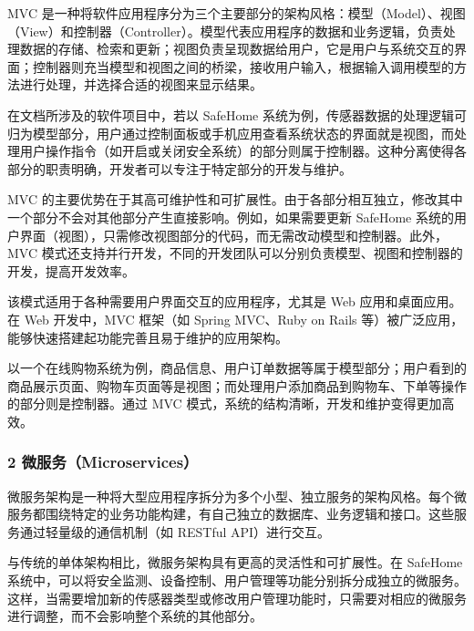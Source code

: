 
MVC 是一种将软件应用程序分为三个主要部分的架构风格：模型（Model）、视图（View）和控制器（Controller）。模型代表应用程序的数据和业务逻辑，负责处理数据的存储、检索和更新；视图负责呈现数据给用户，它是用户与系统交互的界面；控制器则充当模型和视图之间的桥梁，接收用户输入，根据输入调用模型的方法进行处理，并选择合适的视图来显示结果。

在文档所涉及的软件项目中，若以 SafeHome 系统为例，传感器数据的处理逻辑可归为模型部分，用户通过控制面板或手机应用查看系统状态的界面就是视图，而处理用户操作指令（如开启或关闭安全系统）的部分则属于控制器。这种分离使得各部分的职责明确，开发者可以专注于特定部分的开发与维护。


MVC 的主要优势在于其高可维护性和可扩展性。由于各部分相互独立，修改其中一个部分不会对其他部分产生直接影响。例如，如果需要更新 SafeHome 系统的用户界面（视图），只需修改视图部分的代码，而无需改动模型和控制器。此外，MVC 模式还支持并行开发，不同的开发团队可以分别负责模型、视图和控制器的开发，提高开发效率。

该模式适用于各种需要用户界面交互的应用程序，尤其是 Web 应用和桌面应用。在 Web 开发中，MVC 框架（如 Spring MVC、Ruby on Rails 等）被广泛应用，能够快速搭建起功能完善且易于维护的应用架构。


以一个在线购物系统为例，商品信息、用户订单数据等属于模型部分；用户看到的商品展示页面、购物车页面等是视图；而处理用户添加商品到购物车、下单等操作的部分则是控制器。通过 MVC 模式，系统的结构清晰，开发和维护变得更加高效。

\hypertarget{ux5faeux670dux52a1microservices}{%
\subsubsection{2 微服务（Microservices）}\label{ux5faeux670dux52a1microservices}}


微服务架构是一种将大型应用程序拆分为多个小型、独立服务的架构风格。每个微服务都围绕特定的业务功能构建，有自己独立的数据库、业务逻辑和接口。这些服务通过轻量级的通信机制（如 RESTful API）进行交互。

与传统的单体架构相比，微服务架构具有更高的灵活性和可扩展性。在 SafeHome 系统中，可以将安全监测、设备控制、用户管理等功能分别拆分成独立的微服务。这样，当需要增加新的传感器类型或修改用户管理功能时，只需要对相应的微服务进行调整，而不会影响整个系统的其他部分。

